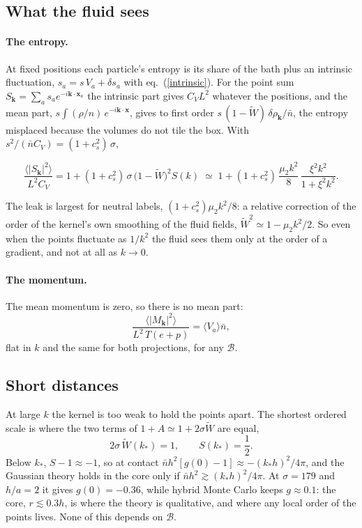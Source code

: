 \documentclass[11pt,aps,preprint,nofootinbib,superscriptaddress,tightenlines]{revtex4-2}
\newcommand{\avg}[1]{\langle #1\rangle}
\newcommand{\klab}{\mathcal B}
\def\st{\begin{equation}}
\def\stp{\end{equation}}
\def\Eq#1{eq.~(\ref{#1})}
\let\oldparagraph\paragraph
\renewcommand{\paragraph}{\par\bigskip\oldparagraph}
\begin{document}
\subsection{What the fluid sees}
\label{sec:leak}

\paragraph{The entropy.}  At fixed positions each particle's entropy is its share of the bath plus an intrinsic fluctuation, $s_a=s\,V_a+\delta s_a$ with
\Eq{intrinsic}.  For the point sum $S_{\bm k}=\sum_as_ae^{-i\bm k\cdot\bm x_a}$ the intrinsic part gives $C_VL^2$ whatever the positions, and the mean part,
$s\int(\rho/n)\,e^{-i\bm k\cdot\bm x}$, gives to first order $s\,(1-\widetilde W)\,\delta\rho_{\bm k}/\bar n$, the entropy misplaced because the volumes do not tile the box.
With $s^2/(\bar nC_V)=(1+c_s^2)\,\sigma$,
\begin{keyeq}
\st
\frac{\avg{|S_{\bm k}|^2}}{L^2C_V}=1+(1+c_s^2)\,\sigma\,\big(1-\widetilde W\big)^2S(k)
\;\simeq\;1+(1+c_s^2)\,\frac{\mu_2k^2}8\,\frac{\xi^2k^2}{1+\xi^2k^2} .
\label{leak}
\stp
\end{keyeq}
The leak is largest for neutral labels, $(1+c_s^2)\mu_2k^2/8$: a relative correction of the order of the kernel's own smoothing of the fluid fields,
$\widetilde W^2\simeq1-\mu_2k^2/2$.  So even when the points fluctuate as $1/k^2$ the fluid sees them only at the order of a gradient, and not at all as $k\to0$.

\paragraph{The momentum.}  The mean momentum is zero, so there is no mean part:
\st
\frac{\avg{|M_{\bm k}|^2}}{L^2\,T(e+p)}=\avg{V_a}\bar n ,
\stp
flat in $k$ and the same for both projections, for any $\klab$.

\subsection{Short distances}
\label{sec:core}

At large $k$ the kernel is too weak to hold the points apart.  The shortest ordered scale is where the two terms of $1+A\simeq1+2\sigma\widetilde W$ are equal,
\st
2\sigma\,\widetilde W(k_*)=1,\qquad S(k_*)=\frac12 .
\stp
Below $k_*$, $S-1\approx-1$, so at contact $\bar nh^2[g(0)-1]\approx-(k_*h)^2/4\pi$, and the Gaussian theory holds in the core only if $\bar nh^2\gtrsim(k_*h)^2/4\pi$.  At
$\sigma=179$ and $h/a=2$ it gives $g(0)=-0.36$, while hybrid Monte Carlo keeps $g\approx0.1$: the core, $r\lesssim0.3h$, is where the theory is qualitative, and where any
local order of the points lives.  None of this depends on $\klab$.
\end{document}
